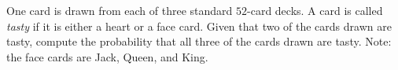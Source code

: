 One card is drawn from each of three standard $52$-card decks. A card is called \emph{tasty} if it is either a heart or a face card. Given that two of the cards drawn are tasty, compute the probability that all three of the cards drawn are tasty. Note: the face cards are Jack, Queen, and King.